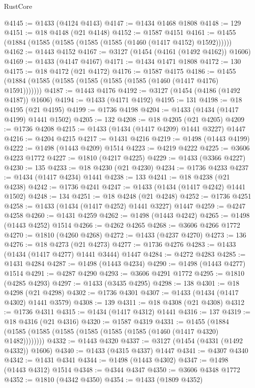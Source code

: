 \begin{lexlean}{RustCore}
\begin{coremodule}
@4145 := @1433 (@4124 @4143)
@4147 := @1434 @1468 @1808
@4148 := 129
@4151 := @18 @4148 (@21 @4148)
@4152 := @1587 @4151
@4161 := @1455 (@1884 (@1585 (@1585 (@1585 (@1585 (@1460 (@1417 @4152) @1592))))))
@4162 := @1443 @4152
@4167 := @3127 (@1454 (@4161 (@1492 @4162)) @1606)
@4169 := @1433 (@4147 @4167)
@4171 := @1434 @1471 @1808
@4172 := 130
@4175 := @18 @4172 (@21 @4172)
@4176 := @1587 @4175
@4186 := @1455 (@1884 (@1585 (@1585 (@1585 (@1585 (@1585 (@1460 (@1417 @4176) @1591)))))))
@4187 := @1443 @4176
@4192 := @3127 (@1454 (@4186 (@1492 @4187)) @1606)
@4194 := @1433 (@4171 @4192)
@4195 := 131
@4198 := @18 @4195 (@21 @4195)
@4199 := @1736 @4198
@4204 := @1433 (@1434 (@1417 @4199) @1441 @1502)
@4205 := 132
@4208 := @18 @4205 (@21 @4205)
@4209 := @1736 @4208
@4215 := @1433 (@1434 (@1417 @4209) @1441 @3227) @1447
@4216 := @4204 @4215
@4217 := @1431 @4216
@4219 := @1498 (@1443 @4199)
@4222 := @1498 (@1443 @4209) @1514
@4223 := @4219 @4222
@4225 := @3606 @4223 @1772
@4227 := @1810 (@4217 @4225)
@4229 := @1433 (@3366 @4227)
@4230 := 135
@4233 := @18 @4230 (@21 @4230)
@4234 := @1736 @4233
@4237 := @1434 (@1417 @4234) @1441
@4238 := 133
@4241 := @18 @4238 (@21 @4238)
@4242 := @1736 @4241
@4247 := @1433 (@1434 (@1417 @4242) @1441 @1502)
@4248 := 134
@4251 := @18 @4248 (@21 @4248)
@4252 := @1736 @4251
@4258 := @1433 (@1434 (@1417 @4252) @1441 @3227) @1447
@4259 := @4247 @4258
@4260 := @1431 @4259
@4262 := @1498 (@1443 @4242)
@4265 := @1498 (@1443 @4252) @1514
@4266 := @4262 @4265
@4268 := @3606 @4266 @1772
@4270 := @1810 (@4260 @4268)
@4272 := @1433 (@4237 @4270)
@4273 := 136
@4276 := @18 @4273 (@21 @4273)
@4277 := @1736 @4276
@4283 := @1433 (@1434 (@1417 @4277) @1441 @3444) @1447
@4284 := @4272 @4283
@4285 := @1431 @4284
@4287 := @1498 (@1443 @4234)
@4290 := @1498 (@1443 @4277) @1514
@4291 := @4287 @4290
@4293 := @3606 @4291 @1772
@4295 := @1810 (@4285 @4293)
@4297 := @1433 (@3435 @4295)
@4298 := 138
@4301 := @18 @4298 (@21 @4298)
@4302 := @1736 @4301
@4307 := @1433 (@1434 (@1417 @4302) @1441 @3579)
@4308 := 139
@4311 := @18 @4308 (@21 @4308)
@4312 := @1736 @4311
@4315 := @1434 (@1417 @4312) @1441
@4316 := 137
@4319 := @18 @4316 (@21 @4316)
@4320 := @1587 @4319
@4331 := @1455 (@1884 (@1585 (@1585 (@1585 (@1585 (@1585 (@1585 (@1460 (@1417 @4320) @1482))))))))
@4332 := @1443 @4320
@4337 := @3127 (@1454 (@4331 (@1492 @4332)) @1606)
@4340 := @1433 (@4315 @4337) @1447
@4341 := @4307 @4340
@4342 := @1431 @4341
@4344 := @1498 (@1443 @4302)
@4347 := @1498 (@1443 @4312) @1514
@4348 := @4344 @4347
@4350 := @3606 @4348 @1772
@4352 := @1810 (@4342 @4350)
@4354 := @1433 (@1809 @4352)

\end{coremodule}
\end{lexlean}
